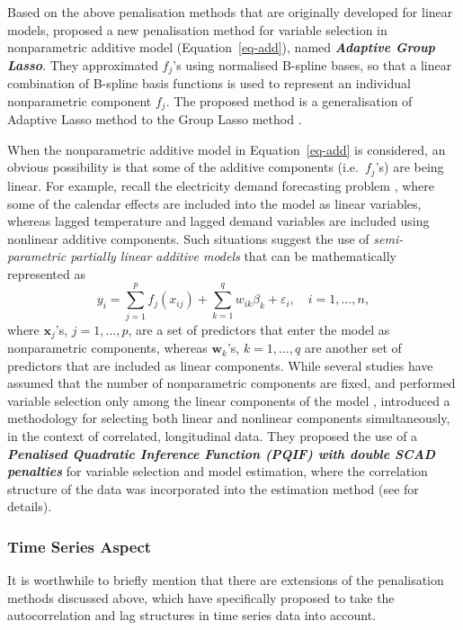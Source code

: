 \documentclass[11pt,a4paper,]{article}
\begin{document}
Based on the above penalisation methods that are originally developed
for linear models, \textcite{Huang2010} proposed a new penalisation
method for variable selection in nonparametric additive model
(Equation~\ref{eq-add}), named \textbf{\emph{Adaptive Group Lasso}}.
They approximated \(f_{j}\)'s using normalised B-spline bases, so that a
linear combination of B-spline basis functions is used to represent an
individual nonparametric component \(f_{j}\). The proposed method is a
generalisation of Adaptive Lasso method \autocite{Zou2006} to the Group
Lasso method \autocite{Yuan2006}.

When the nonparametric additive model in Equation~\ref{eq-add} is
considered, an obvious possibility is that some of the additive
components (i.e.~\(f_{j}\)'s) are being linear. For example, recall the
electricity demand forecasting problem \autocite{HF2010,FH2012}, where
some of the calendar effects are included into the model as linear
variables, whereas lagged temperature and lagged demand variables are
included using nonlinear additive components. Such situations suggest
the use of \emph{semi-parametric partially linear additive models} that
can be mathematically represented as \[
 y_{i} = \sum_{j=1}^{p} {f_{j}(x_{ij})} + \sum_{k=1}^{q} {w_{ik}\beta_{k}} + \varepsilon_{i}, \quad i = 1, \dots, n,
\] where \(\bm{x}_{j}\)'s, \(j = 1, \dots, p\), are a set of predictors
that enter the model as nonparametric components, whereas
\(\bm{w}_{k}\)'s, \(k = 1, \dots, q\) are another set of predictors that
are included as linear components. While several studies have assumed
that the number of nonparametric components are fixed, and performed
variable selection only among the linear components of the model
\autocite{Lian2012,Guo2013,Liu2011}, \textcite{Wang2014} introduced a
methodology for selecting both linear and nonlinear components
simultaneously, in the context of correlated, longitudinal data. They
proposed the use of a \textbf{\emph{Penalised Quadratic Inference
Function (PQIF) with double SCAD penalties}} for variable selection and
model estimation, where the correlation structure of the data was
incorporated into the estimation method (see \textcite{Wang2014} for
details).

\hypertarget{time-series-aspect}{%
\subsubsection{Time Series Aspect}\label{time-series-aspect}}

It is worthwhile to briefly mention that there are extensions of the
penalisation methods discussed above, which have specifically proposed
to take the autocorrelation and lag structures in time series data into
account.
\end{document}
